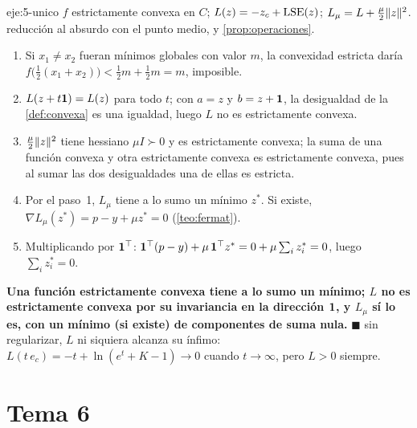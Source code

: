 \begin{solucion}{eje:5-unico}
\datos $f$ estrictamente convexa en $C$; $L(z)=-z_c+\operatorname{LSE}(z)$; $L_\mu=L+\tfrac\mu2\lVert z\rVert^{2}$.
\planteamiento reducción al absurdo con el punto medio, y \cref{prop:operaciones}.
\pasos
\begin{enumerate}[label=\arabic*.]
  \item Si $x_1\ne x_2$ fueran mínimos globales con valor $m$, la convexidad estricta daría $f\bigl(\tfrac12(x_1+x_2)\bigr)<\tfrac12m+\tfrac12m=m$, imposible.
  \item $L(z+t\mathbf{1})=L(z)$ para todo $t$; con $a=z$ y $b=z+\mathbf{1}$, la desigualdad de la \cref{def:convexa} es una igualdad, luego $L$ no es estrictamente convexa.
  \item $\tfrac\mu2\lVert z\rVert^{2}$ tiene hessiano $\mu I\succ 0$ y es estrictamente convexa; la suma de una función convexa y otra estrictamente convexa es estrictamente convexa, pues al sumar las dos desigualdades una de ellas es estricta.
  \item Por el paso~1, $L_\mu$ tiene a lo sumo un mínimo $z^{*}$. Si existe, $\nabla L_\mu(z^{*})=p-y+\mu z^{*}=0$ (\cref{teo:fermat}).
  \item Multiplicando por $\mathbf{1}^{\top}$: $\mathbf{1}^{\top}(p-y)+\mu\,\mathbf{1}^{\top} z^{*}=0+\mu\sum_iz^{*}_i=0$, luego $\sum_iz^{*}_i=0$.
\end{enumerate}
\resultado \textbf{Una función estrictamente convexa tiene a lo sumo un mínimo; $L$ no es estrictamente convexa por su invariancia en la dirección $\mathbf{1}$, y $L_\mu$ sí lo es, con un mínimo (si existe) de componentes de suma nula.} $\blacksquare$
\comprobacion sin regularizar, $L$ ni siquiera alcanza su ínfimo: $L(t\,e_c)=-t+\ln(e^{t}+K-1)\to 0$ cuando $t\to\infty$, pero $L>0$ siempre.
\end{solucion}

\section{Tema 6}

